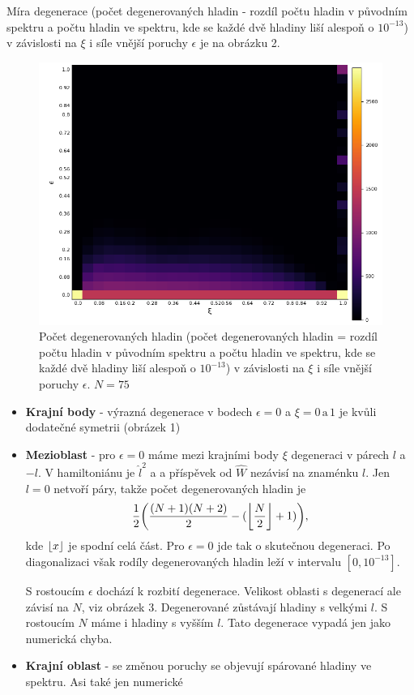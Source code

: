 \documentclass{article}
\DeclarePairedDelimiter\floor{\lfloor}{\rfloor}
\begin{document}
Míra degenerace (počet degenerovaných hladin - rozdíl počtu hladin v původním spektru a počtu hladin ve spektru, kde se každé dvě hladiny liší alespoň
o $10^{-13}$) v závislosti na $\xi$ i síle vnější poruchy $\epsilon$ je na obrázku 2.

\begin{figure}[H]
    \centering
    \includegraphics[width=.75\linewidth]{Deg.png}
    \caption{Počet degenerovaných hladin  (počet degenerovaných hladin = rozdíl počtu hladin v původním spektru a počtu hladin ve spektru, kde se každé dvě hladiny liší alespoň
    o $10^{-13}$) v závislosti na $\xi$ i síle vnější poruchy $\epsilon$. $N = 75$}
  \end{figure}

\begin{itemize}
    \item \textbf{Krajní body} - výrazná degenerace v bodech $\epsilon = 0$ a $\xi = 0\,\text{a}\,1$ je kvůli dodatečné symetrii (obrázek 1)
    \item \textbf{Mezioblast} - pro $\epsilon = 0$ máme mezi krajními body $\xi$ degeneraci v párech $l$ a $-l$. V hamiltoniánu je $\hat{l}^2$ a 
    a příspěvek od $\hat{W}$ nezávisí na znaménku $l$.
    Jen $l = 0$ netvoří páry, takže počet degenerovaných hladin je 
    $$ \frac{1}{2}\bigg( \frac{(N+1)(N+2)}{2} - (\floor*{\frac{N}{2}} + 1) \bigg), $$
kde $\floor*{x}$ je spodní celá část. Pro  $\epsilon = 0$ jde tak o skutečnou degeneraci. Po diagonalizaci však rodíly degenerovaných hladin 
leží v intervalu $[0,10^{-13}]$.

S rostoucím $\epsilon$ dochází k rozbití degenerace. Velikost oblasti s degenerací ale závisí na $N$, viz obrázek 3. Degenerované zůstávají
hladiny s velkými $l$. S rostoucím $N$ máme i hladiny s vyšším $l$. Tato degenerace vypadá jen jako numerická chyba. 

    \item \textbf{Krajní oblast} - se změnou poruchy se objevují spárované hladiny ve spektru. Asi také jen numerické
\end{itemize}
\end{document}
